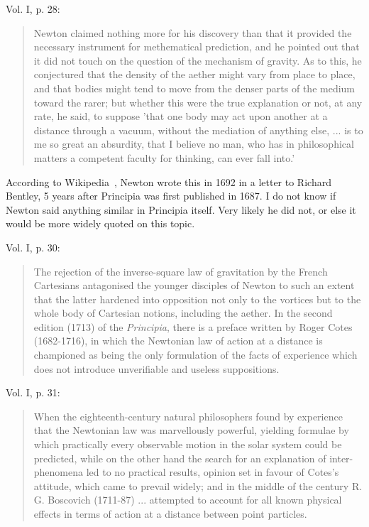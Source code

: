 \documentclass[a4paper]{article}
\theoremstyle{plain}
\theoremstyle{definition}
\begin{document}
Vol. I, p. 28:

\begin{quote}
  Newton claimed nothing more for his discovery than that it provided
  the necessary instrument for methematical prediction, and he pointed out
  that it did not touch on the question of the mechanism of gravity.
  As to this, he conjectured that the density of the aether might vary from
  place to place, and that bodies might tend to move from the denser parts
  of the medium toward the rarer; but whether this were the true explanation
  or not, at any rate, he said, to suppose 'that one body may act upon
  another at a distance through a vacuum, without the mediation of anything
  else, ... is to me so great an absurdity, that I believe no man, who has
  in philosophical matters a competent faculty for thinking, can ever fall
  into.'
\end{quote}

According to Wikipedia~\cite{WikipediaNewtonLawOfGravity}, Newton
wrote this in 1692 in a letter to Richard Bentley, 5 years after
Principia was first published in 1687.  I do not know if Newton said
anything similar in Principia itself.  Very likely he did not, or else
it would be more widely quoted on this topic.

Vol. I, p. 30:

\begin{quote}
  The rejection of the inverse-square law of gravitation by the French
  Cartesians antagonised the younger disciples of Newton to such an
  extent that the latter hardened into opposition not only to the
  vortices but to the whole body of Cartesian notions, including the
  aether.  In the second edition (1713) of the {\em Principia}, there
  is a preface written by Roger Cotes (1682-1716), in which the
  Newtonian law of action at a distance is championed as being the
  only formulation of the facts of experience which does not introduce
  unverifiable and useless suppositions.
\end{quote}

Vol. I, p. 31:

\begin{quote}
  When the eighteenth-century natural philosophers found by experience
  that the Newtonian law was marvellously powerful, yielding formulae
  by which practically every observable motion in the solar system
  could be predicted, while on the other hand the search for an
  explanation of inter-phenomena led to no practical results, opinion
  set in favour of Cotes's attitude, which came to prevail widely; and
  in the middle of the century R. G. Boscovich (1711-87) ... attempted
  to account for all known physical effects in terms of action at a
  distance between point particles.
\end{quote}
\end{document}
